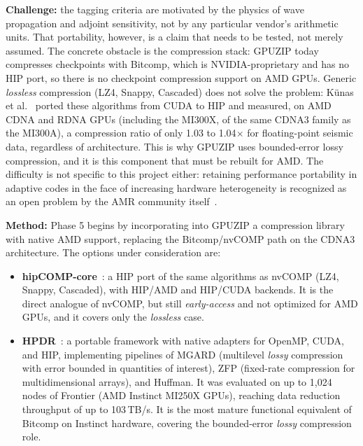 \documentclass[12pt,a4paper]{article}
\begin{document}
\textbf{Challenge:} the tagging criteria are motivated by the physics of
wave propagation and adjoint sensitivity, not by any particular vendor's
arithmetic units. That portability, however, is a claim that needs to be
tested, not merely assumed. The concrete obstacle is the compression
stack: GPUZIP today compresses checkpoints with Bitcomp, which is
NVIDIA-proprietary and has no HIP port, so there is no checkpoint
compression support on AMD GPUs. Generic \emph{lossless} compression (LZ4,
Snappy, Cascaded) does not solve the problem: Künas et
al.~\cite{kunas2026amdcompression} ported these algorithms from CUDA to
HIP and measured, on AMD CDNA and RDNA GPUs (including the MI300X, of the
same CDNA3 family as the MI300A), a compression ratio of only 1.03 to
1.04$\times$ for floating-point seismic data, regardless of architecture.
This is why GPUZIP uses bounded-error lossy compression, and it is this
component that must be rebuilt for AMD. The difficulty is not specific to
this project either: retaining performance portability in adaptive codes in
the face of increasing hardware heterogeneity is recognized as an open
problem by the AMR community itself~\cite{dubey2021portability}.

\textbf{Method:} Phase 5 begins by incorporating into GPUZIP a compression
library with native AMD support, replacing the Bitcomp/nvCOMP path on the
CDNA3 architecture. The options under consideration are:

\begin{itemize}
  \item \textbf{hipCOMP-core}~\cite{hipcompcore}: a HIP port of the same
        algorithms as nvCOMP (LZ4, Snappy, Cascaded), with HIP/AMD and
        HIP/CUDA backends. It is the direct analogue of nvCOMP, but still
        \emph{early-access} and not optimized for AMD GPUs, and it covers
        only the \emph{lossless} case.
  \item \textbf{HPDR}~\cite{chen2025hpdr}: a portable framework with
        native adapters for OpenMP, CUDA, and HIP, implementing pipelines
        of MGARD (multilevel \emph{lossy} compression with error bounded
        in quantities of interest), ZFP (fixed-rate compression for
        multidimensional arrays), and Huffman. It was evaluated on up to
        1,024 nodes of Frontier (AMD Instinct MI250X GPUs), reaching data
        reduction throughput of up to 103\,TB/s. It is the most mature
        functional equivalent of Bitcomp on Instinct hardware, covering
        the bounded-error \emph{lossy} compression role.
\end{itemize}
\end{document}
